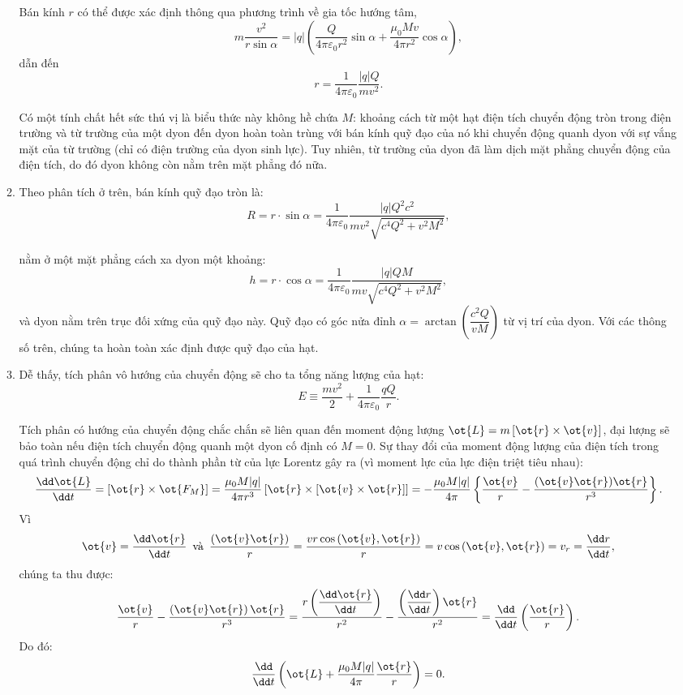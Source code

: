 \begin{loigiai}
\begin{enumerate}[1)]
\begin{enumerate}[1)]
Bán kính $r$ có thể được xác định thông qua phương trình về gia tốc hướng tâm,
  \[ m \dfrac{v^2}{r \sin \alpha} = |q| \left( \dfrac{Q}{4\pi \varepsilon_0 r^2} \sin \alpha+ \dfrac{\mu_0 Mv}{4\pi r^2} \cos \alpha\right),\]
dẫn đến
  \[r = \dfrac{1}{4\pi\varepsilon_0} \dfrac{|q|Q}{mv^2}.\]

Có một tính chất hết sức thú vị là biểu thức này không hề chứa $M$: khoảng cách từ một hạt điện tích chuyển động tròn trong điện trường và từ trường của một dyon đến dyon hoàn toàn trùng với bán kính quỹ đạo của nó khi chuyển động quanh dyon với sự vắng mặt của từ trường (chỉ có điện trường của dyon sinh lực). Tuy nhiên, từ trường của dyon đã làm dịch mặt phẳng chuyển động của điện tích, do đó dyon không còn nằm trên mặt phẳng đó nữa.
 \item Theo phân tích ở trên, bán kính quỹ đạo tròn là:
 \[R = r \cdot \sin \alpha = \dfrac{1}{4\pi \varepsilon_0}\dfrac{|q|Q^2c^2}{mv^2 \sqrt{c^4 Q^2 +v^2 M^2}},\]

nằm ở một mặt phẳng cách xa dyon một khoảng:
  \[h = r \cdot \cos \alpha = \dfrac{1}{4\pi\varepsilon_0} \dfrac{|q|QM}{mv \sqrt{c^4 Q^2 + v^2 M^2}}, \]
và dyon nằm trên trục đối xứng của quỹ đạo này. Quỹ đạo có góc nửa đỉnh $\alpha = \arctan \left(\dfrac{c^2Q}{vM}\right)$ từ vị trí của dyon. Với các thông số trên, chúng ta hoàn toàn xác định được quỹ đạo của hạt.
  \item Dễ thấy, tích phân vô hướng của chuyển động sẽ cho ta tổng năng lượng của hạt:
  \[E \equiv \dfrac{mv^2}{2} + \dfrac{1}{4\pi \varepsilon_0}\dfrac{qQ}{r}.\]

Tích phân có hướng của chuyển động chắc chắn sẽ liên quan đến moment động lượng $\ot{L} = m \left[\ot{r}\times \ot{v}\right]$, đại lượng sẽ bảo toàn nếu điện tích chuyển động quanh một dyon cố định có $M=0$. Sự thay đổi của moment động lượng của điện tích trong quá trình chuyển động chỉ do thành phần từ của lực Lorentz gây ra (vì moment lực của lực điện triệt tiêu nhau):
   \[  \dfrac{\dd \ot{L}}{\dd t} = \left[\ot{r} \times \ot{F_M} \right] = \dfrac{\mu_0 M|q|}{4 \pi r^3} \left[\ot{r}\times \left[ \ot{v} \times \ot{r}\right]\right]= -\dfrac{\mu_0 M|q|}{4\pi} \left\{\dfrac{\ot{v}}{r} - \dfrac{(\ot{v}\ot{r})\ot{r}}{r^3}\right\}.\]
Vì
  \[\ot{v} = \dfrac{\dd \ot{r}}{\dd t} \,\text{ và }\, \dfrac{\left(\ot{v}\ot{r} \right)}{r}  = \dfrac{vr\cos\left(\ot{v},\ot{r}\right)}{r}= v\cos \left(\ot{v},\ot{r}\right) = v_r = \dfrac{\dd r}{\dd t},\]
chúng ta thu được:
  \[\dfrac{\ot{v}}{r} - \dfrac{\left(\ot{v}\ot{r}\right)\ot{r}}{r^3} = \dfrac{r\left(\dfrac{\dd \ot{r}}{\dd t}\right)}{r^2} - \dfrac{\left(\dfrac{\dd r}{\dd t}\right) \ot{r}}{r^2} = \dfrac{\dd}{\dd t} \left(\dfrac{\ot{r}}{r}\right).\]
Do đó:
  \[\dfrac{\dd}{\dd t}\left(\ot{L} + \dfrac{\mu_0 M |q|}{4\pi} \dfrac{\ot{r}}{r} \right) = 0.\]


\end{enumerate}
\end{enumerate}
\end{loigiai}
